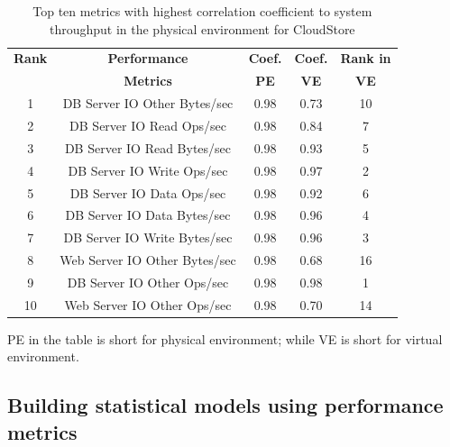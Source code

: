 \documentclass[smallextended]{svjour3}       %
\begin{document}
\begin{table}[tbh]
	\centering
	\caption{Top ten metrics with highest correlation coefficient to system throughput in the physical environment for CloudStore}
	\label{tab:top10csp}
	\begin{threeparttable}
		
		\begin{tabular}{|c||c|c|c|c|}
			\hline
			\textbf{Rank} & \textbf{Performance } & \textbf{Coef. } & \textbf{Coef. } & \textbf{Rank in} \\ %
			& \textbf{ Metrics} & \textbf{PE} & \textbf{VE} & \textbf{VE} \\ %
			\midrule
			\midrule
			1 & DB Server IO Other Bytes/sec & 0.98 & 0.73 & 10 \\ \hline
			2 & DB Server IO Read Ops/sec & 0.98 & 0.84 & 7 \\ \hline
			3 & DB Server IO Read Bytes/sec & 0.98 & 0.93 & 5 \\ \hline
			4 & DB Server IO Write Ops/sec & 0.98 & 0.97 & 2 \\ \hline
			5 & DB Server IO Data Ops/sec & 0.98 & 0.92 & 6 \\ \hline
			6 & DB Server IO Data Bytes/sec & 0.98 & 0.96 & 4 \\ \hline
			7 & DB Server IO Write Bytes/sec & 0.98 & 0.96 & 3 \\ \hline
			8 & Web Server IO Other Bytes/sec & 0.98 & 0.68 & 16 \\ \hline
			9 & DB Server IO Other Ops/sec & 0.98 & 0.98 & 1 \\ \hline
			10 & Web Server IO Other Ops/sec & 0.98 & 0.70 & 14 \\ \hline
		\end{tabular}%
		\begin{tablenotes}
			\item PE in the table is short for physical environment; while VE is short for virtual environment.
		\end{tablenotes}
	\end{threeparttable}
	
	
\end{table}



\subsection{Building statistical models using performance metrics}
\label{sec:model}
 
\end{document}
